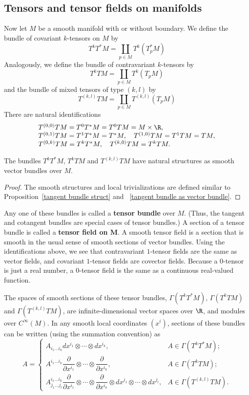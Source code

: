 \subsection{Tensors and tensor fields on manifolds}
Now let $M$ be a smooth manifold with or without boundary. We define the bundle
of covariant $k$-tensors on $M$ by
\[T^kT^*M=\coprod_{p\in M}T^k(T^*_pM)\]
Analogously, we define the bundle of contravariant $k$-tensors by
\[T^kTM=\coprod_{p\in M}T^k(T_pM)\]
and the bundle of mixed tensors of type $(k,l)$ by
\[T^{(k,l)}TM=\coprod_{p\in M}T^{(k,l)}(T_pM)\]
There are natural identifications
\[\begin{array}{l}
T^{(0,0)}TM=T^{0}T^*M=T^{0}TM=M\times\R,\\
T^{(0,1)}TM=T^1T^*M=T^*M,\quad T^{(1,0)}TM=T^1TM=TM,\\
T^{(0,k)}TM=T^kT^*M,\quad T^{(k,0)}TM=T^kTM.
\end{array}\]
\begin{proposition}
The bundles $T^kT^*M$, $T^kTM$ and $T^{(k,l)}TM$ have natural structures as smooth vector bundles over $M$.
\end{proposition}
\begin{proof}
The smooth structures and local trivializations are defined similar to Proposition~\ref{tangent bundle struct} and ~\ref{tangent bundle as vector bundle}.
\end{proof}
Any one of these bundles is called a \textbf{tensor bundle} over $M$. (Thus, the tangent and cotangent bundles are special cases of tensor bundles.) A section of a tensor bundle is called a \textbf{tensor field on $\bm{M}$}. A smooth tensor field is a section that is smooth in the usual sense of smooth sections of vector
bundles. Using the identifications above, we see that contravariant $1$-tensor fields are the same as vector fields, and covariant $1$-tensor fields are covector fields. Because a $0$-tensor is just a real number, a $0$-tensor field is the same as a continuous real-valued function.\par
The spaces of smooth sections of these tensor bundles, $\Gamma(T^kT^*M)$, $\Gamma(T^kTM)$ and $\Gamma(T^{(k,l)}TM)$, are infinite-dimensional vector spaces over $\R$, and modules over $C^\infty(M)$. In any smooth local coordinates $(x^i)$, sections of these bundles can be written (using the summation convention) as
\[A=\left\{\begin{array}{ll}
A_{i_1\dots i_k}dx^{i_1}\otimes\cdots\otimes dx^{i_k},&A\in\Gamma(T^kT^*M);\\[8pt]
A^{i_1\dots i_k}\dfrac{\partial}{\partial x^{i_1}}\otimes\cdots\otimes\dfrac{\partial}{\partial x^{i_k}},&A\in\Gamma(T^kTM);\\[8pt]
A^{i_1\dots i_k}_{j_1\dots j_l}\dfrac{\partial}{\partial x^{i_1}}\otimes\cdots\otimes\dfrac{\partial}{\partial x^{i_k}}\otimes dx^{j_1}\otimes\cdots\otimes dx^{j_l},&A\in\Gamma(T^{(k,l)}TM).
\end{array}\right. \]
